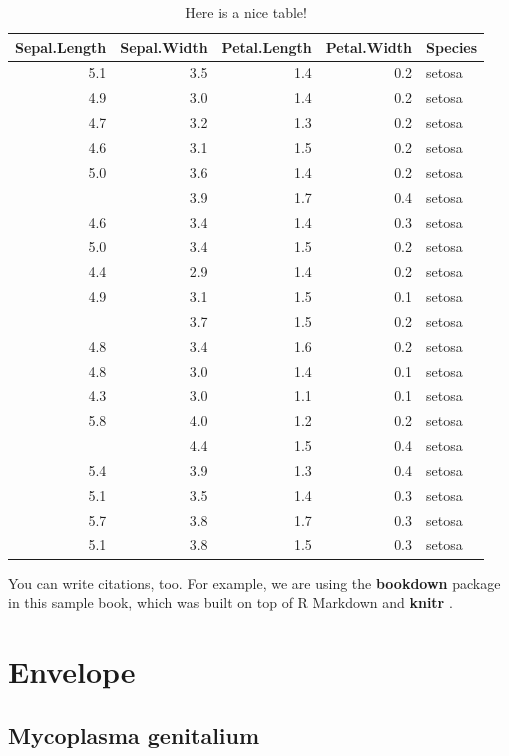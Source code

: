 \documentclass[]{book}
\begin{document}
\begin{table}[t]

\caption{\label{tab:nice-tab}Here is a nice table!}
\centering
\begin{tabular}{rrrrl}
\toprule
Sepal.Length & Sepal.Width & Petal.Length & Petal.Width & Species\\
\midrule
5.1 & 3.5 & 1.4 & 0.2 & setosa\\
4.9 & 3.0 & 1.4 & 0.2 & setosa\\
4.7 & 3.2 & 1.3 & 0.2 & setosa\\
4.6 & 3.1 & 1.5 & 0.2 & setosa\\
5.0 & 3.6 & 1.4 & 0.2 & setosa\\
\addlinespace
5.4 & 3.9 & 1.7 & 0.4 & setosa\\
4.6 & 3.4 & 1.4 & 0.3 & setosa\\
5.0 & 3.4 & 1.5 & 0.2 & setosa\\
4.4 & 2.9 & 1.4 & 0.2 & setosa\\
4.9 & 3.1 & 1.5 & 0.1 & setosa\\
\addlinespace
5.4 & 3.7 & 1.5 & 0.2 & setosa\\
4.8 & 3.4 & 1.6 & 0.2 & setosa\\
4.8 & 3.0 & 1.4 & 0.1 & setosa\\
4.3 & 3.0 & 1.1 & 0.1 & setosa\\
5.8 & 4.0 & 1.2 & 0.2 & setosa\\
\addlinespace
5.7 & 4.4 & 1.5 & 0.4 & setosa\\
5.4 & 3.9 & 1.3 & 0.4 & setosa\\
5.1 & 3.5 & 1.4 & 0.3 & setosa\\
5.7 & 3.8 & 1.7 & 0.3 & setosa\\
5.1 & 3.8 & 1.5 & 0.3 & setosa\\
\bottomrule
\end{tabular}
\end{table}

You can write citations, too. For example, we are using the
\textbf{bookdown} package \citep{R-bookdown} in this sample book, which
was built on top of R Markdown and \textbf{knitr} \citep{xie2015}.

\chapter{Envelope}\label{envelope}

\section{Mycoplasma genitalium}\label{mycoplasma-genitalium}
\end{document}

